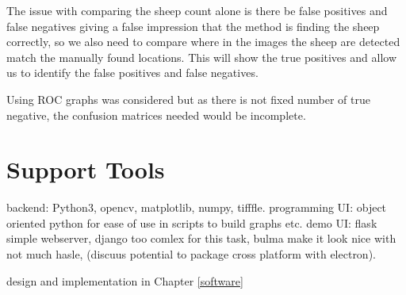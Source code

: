 The issue with comparing the sheep count alone is there be false positives and false negatives giving a false impression that the method is finding the sheep correctly, so we also need to compare where in the images the sheep are detected match the manually found locations. This will show the true positives and allow us to identify the false positives and false negatives.

Using ROC graphs was considered but as there is not fixed number of true negative, the confusion matrices needed would be incomplete. 

\section{Support Tools}
\begin{comment}
You should also identify any support tools that you used. You should discuss your choice of implementation tools or simulation tools. For any code that you have written, you can talk about languages and related tools. For any simulation and analysis tools, identify the tools and how they are used on the project. 

For the parts of your project that need some engineering (hardware, software, firmware, or a mixture) to support the experiments, include details in your report about your design and implementation. You should discuss with your supervisor whether it is better to include a different top-level section to describe any engineering work.  In this template, Chapter 3 is suggested as a place for that discussion.
\end{comment}

backend: Python3, opencv, matplotlib, numpy, tifffle.
programming UI: object oriented python for ease of use in scripts to build graphs etc.
demo UI: flask simple webserver, django too comlex for this task, bulma make it look nice with not much hasle, (discuus potential to package cross platform with electron). 

design and implementation in Chapter \ref{software}


